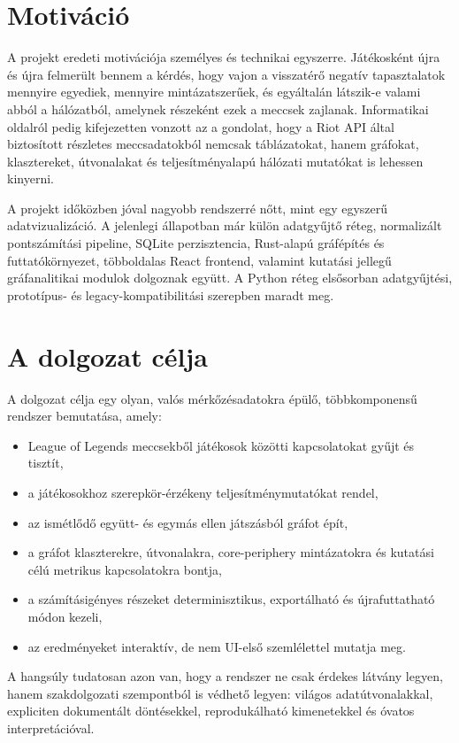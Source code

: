 ﻿\documentclass[a4paper,12pt]{report}
\begin{document}
\section{Motiváció}

A projekt eredeti motivációja személyes és technikai egyszerre. Játékosként újra és újra felmerült bennem a kérdés, hogy vajon a visszatérő negatív tapasztalatok mennyire egyediek, mennyire mintázatszerűek, és egyáltalán látszik-e valami abból a hálózatból, amelynek részeként ezek a meccsek zajlanak. Informatikai oldalról pedig kifejezetten vonzott az a gondolat, hogy a Riot API által biztosított részletes meccsadatokból nemcsak táblázatokat, hanem gráfokat, klasztereket, útvonalakat és teljesítményalapú hálózati mutatókat is lehessen kinyerni.

A projekt időközben jóval nagyobb rendszerré nőtt, mint egy egyszerű adatvizualizáció. A jelenlegi állapotban már külön adatgyűjtő réteg, normalizált pontszámítási pipeline, SQLite perzisztencia, Rust-alapú gráfépítés és futtatókörnyezet, többoldalas React frontend, valamint kutatási jellegű gráfanalitikai modulok dolgoznak együtt. A Python réteg elsősorban adatgyűjtési, prototípus- és legacy-kompatibilitási szerepben maradt meg.

\section{A dolgozat célja}

A dolgozat célja egy olyan, valós mérkőzésadatokra épülő, többkomponensű rendszer bemutatása, amely:

\begin{itemize}
    \item League of Legends meccsekből játékosok közötti kapcsolatokat gyűjt és tisztít,
    \item a játékosokhoz szerepkör-érzékeny teljesítménymutatókat rendel,
    \item az ismétlődő együtt- és egymás ellen játszásból gráfot épít,
    \item a gráfot klaszterekre, útvonalakra, core-periphery mintázatokra és kutatási célú metrikus kapcsolatokra bontja,
    \item a számításigényes részeket determinisztikus, exportálható és újrafuttatható módon kezeli,
    \item az eredményeket interaktív, de nem UI-első szemlélettel mutatja meg.
\end{itemize}

A hangsúly tudatosan azon van, hogy a rendszer ne csak érdekes látvány legyen, hanem szakdolgozati szempontból is védhető legyen: világos adatútvonalakkal, expliciten dokumentált döntésekkel, reprodukálható kimenetekkel és óvatos interpretációval.
\end{document}
